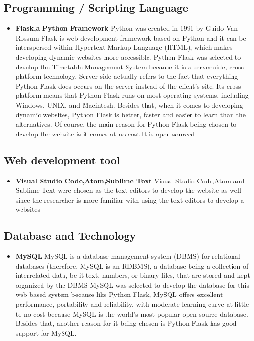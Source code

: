 \documentclass{scrreprt}
\begin{document}
\subsection {Programming / Scripting Language }
\begin {itemize}
\item \textbf{ Flask,a  Python Framework }
Python was created in 1991 by  Guido Van Rossum
 Flask is web development framework based on Python and it can  be
interspersed within Hypertext Markup Language (HTML), which makes developing
dynamic websites more accessible. Python Flask was selected to develop the Timetable Management System because it is a server side, cross-platform technology. Server-side actually refers to the fact that everything
Python Flask does occurs on the server instead of the client’s site. Its cross-platform means that
Python Flask runs on most operating systems, including Windows, UNIX, and Macintosh.  Besides that, when it comes to developing dynamic websites, Python Flask is better, faster and easier to learn than the alternatives. Of course, the main reason for
Python Flask being chosen to develop the website is it comes at no cost.It is open sourced.
\end {itemize}
\subsection {Web development tool}
\begin {itemize}
\item \textbf{Visual Studio Code,Atom,Sublime Text }
Visual Studio Code,Atom and Sublime Text were chosen as the text editors to develop the website as
well since the researcher is more familiar with using the text editors to develop a
websites
\end {itemize}
\subsection { Database and Technology}
 \begin{itemize}
\item \textbf{MySQL}
MySQL is a database management system (DBMS) for relational databases (therefore,
MySQL is an RDBMS), a database being a collection of interrelated data, be it text,
numbers, or binary files, that are stored and kept organized by the DBMS 
MySQL was selected to develop the database for this web based system because like Python Flask, MySQL offers excellent performance, portability and reliability, with moderate
learning curve at little to no cost because MySQL is the world’s most popular open
source database. Besides that, another reason for it being chosen is Python Flask  has good
support for MySQL.
\end{itemize}
 
\end{document}
